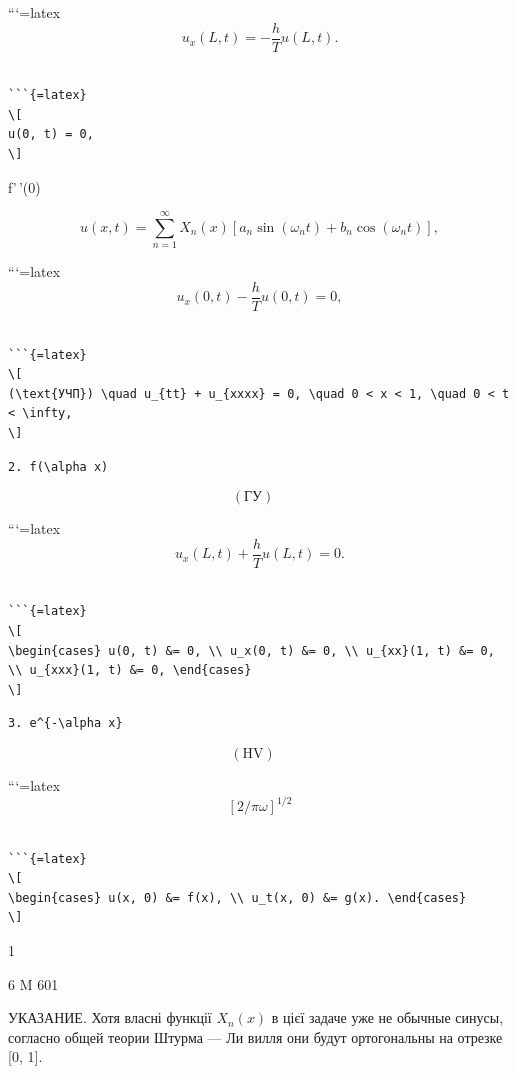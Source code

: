 \documentclass[
  ukrainian,
]{article}
\begin{document}
```{=latex}
\[
u_{x}(L, t) = -\frac{h}{T} u(L, t).
\]

\begin{verbatim}

```{=latex}
\[
u(0, t) = 0,
\]
\end{verbatim}

f'\,'(0)

\[
u(x, t) = \sum_{n=1}^{\infty} X_n(x) \left[ a_n \sin(\omega_n t) + b_n \cos(\omega_n t) \right],
\]

```{=latex}
\[
u_{x}(0, t) - \frac{h}{T}u(0, t) = 0,
\]

\begin{verbatim}

```{=latex}
\[
(\text{УЧП}) \quad u_{tt} + u_{xxxx} = 0, \quad 0 < x < 1, \quad 0 < t < \infty,
\]
\end{verbatim}

\begin{verbatim}
2. f(\alpha x)
\end{verbatim}

\[
(\text{ГУ}) \quad
\]

```{=latex}
\[
u_{x}(L, t) + \frac{h}{T}u(L, t) = 0.
\]

\begin{verbatim}

```{=latex}
\[
\begin{cases} u(0, t) &= 0, \\ u_x(0, t) &= 0, \\ u_{xx}(1, t) &= 0, \\ u_{xxx}(1, t) &= 0, \end{cases}
\]
\end{verbatim}

\begin{verbatim}
3. e^{-\alpha x}
\end{verbatim}

\[
(\text{HV}) \quad
\]

```{=latex}
\[
[2/\pi\omega]^{1/2}
\]

\begin{verbatim}

```{=latex}
\[
\begin{cases} u(x, 0) &= f(x), \\ u_t(x, 0) &= g(x). \end{cases}
\]
\end{verbatim}

1

6 M 601

УКАЗАНИЕ. Хотя власні функції \(X_n(x)\) в цієї задаче уже не обычные
синусы, согласно общей теории Штурма --- Ли вилля они будут ортогональны
на отрезке {[}0, 1{]}.
\end{document}
